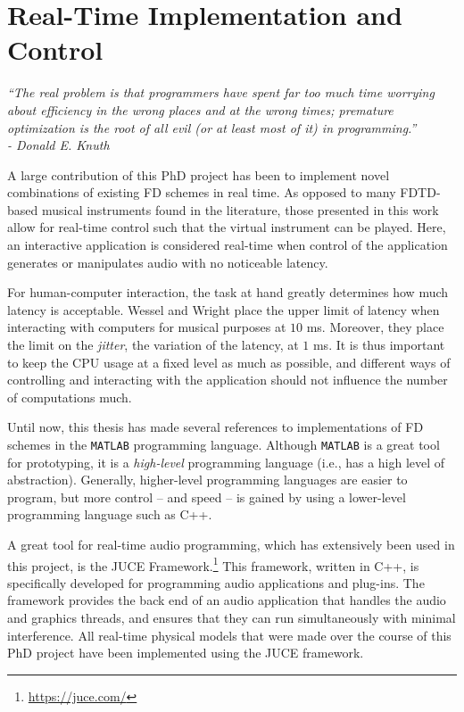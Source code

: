 \chapter{Real-Time Implementation and Control}\label{ch:realtime}

\begin{flushright}{\it
    ``The real problem is that programmers have spent far too much time worrying \\
    about efficiency in the wrong places and at the wrong times; premature\\
    optimization is the root of all evil (or at least most of it) in programming.''\\
    - Donald E. Knuth}
\end{flushright}
%
\vspace{2em}
\noindent A large contribution of this PhD project has been to implement novel combinations of existing FD schemes in real time. As opposed to many FDTD-based musical instruments found in the literature, those presented in this work allow for real-time control such that the virtual instrument can be played. Here, an interactive application is considered real-time when control of the application generates or manipulates audio with no noticeable latency.

For human-computer interaction, the task at hand greatly determines how much latency is acceptable. Wessel and Wright \cite{Wessel2002} place the upper limit of latency when interacting with computers for musical purposes at $10$ ms. Moreover, they place the limit on the \textit{jitter}, the variation of the latency, at $1$ ms. It is thus important to keep the CPU usage at a fixed level as much as possible, and different ways of controlling and interacting with the application should not influence the number of computations much.

Until now, this thesis has made several references to implementations of FD schemes in the \texttt{MATLAB} programming language.
Although \texttt{MATLAB} is a great tool for prototyping, it is a \textit{high-level} programming language (i.e., has a high level of abstraction). Generally, higher-level programming languages are easier to program, but more control -- and speed -- is gained by using a lower-level programming language such as C++.


A great tool for real-time audio programming, which has extensively been used in this project, is the JUCE Framework.\footnote{\url{https://juce.com/}} This framework, written in C++, is specifically developed for programming audio applications and plug-ins. The framework provides the back end of an audio application that handles the audio and graphics threads, and ensures that they can run simultaneously with minimal interference. All real-time physical models that were made over the course of this PhD project have been implemented using the JUCE framework. 

